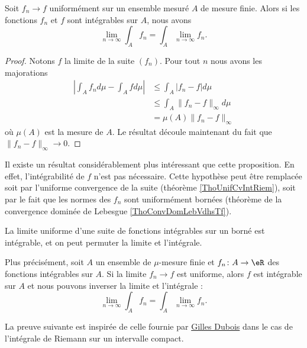 \begin{proposition}       \label{PropbhKnth}
    Soit \( f_n\to f\) uniformément sur un ensemble mesuré \( A\) de mesure finie. Alors si les fonctions \( f_n\) et \( f\) sont intégrables sur \( A\), nous avons
    \begin{equation}
        \lim_{n\to \infty} \int_A f_n=\int_A \lim_{n\to \infty} f_n.
    \end{equation}
\end{proposition}

\begin{proof}
    Notons \( f\) la limite de la suite \( (f_n)\). Pour tout \( n\) nous avons les majorations
    \begin{subequations}
        \begin{align}
            \left| \int_A f_n d\mu-\int_A fd\mu \right| &\leq \int_A| f_n-f |d\mu\\
            &\leq \int_A \| f_n-f \|_{\infty}d\mu\\
            &=\mu(A)\| f_n-f \|_{\infty}
        \end{align}
    \end{subequations}
    où \( \mu(A)\) est la mesure de \( A\). Le résultat découle maintenant du fait que \( \| f_n-f \|_{\infty}\to 0\).
\end{proof}
Il existe un résultat considérablement plus intéressant que cette proposition. En effet, l'intégrabilité de \( f\) n'est pas nécessaire. Cette hypothèse peut être remplacée soit par l'uniforme convergence de la suite (théorème \ref{ThoUnifCvIntRiem}), soit par le fait que les normes des \( f_n\) sont uniformément bornées (théorème de la convergence dominée de Lebesgue \ref{ThoConvDomLebVdhsTf}).

\begin{theorem}			\label{ThoUnifCvIntRiem}
    La limite uniforme d'une suite de fonctions intégrables sur un borné est intégrable, et on peut permuter la limite et l'intégrale. 
    
    Plus précisément, soit \( A\) un ensemble de \( \mu\)-mesure finie et \( f_n\colon A\to \eR\) des fonctions intégrables sur \( A\). Si la limite \( f_n\to f\) est uniforme, alors \( f\) est intégrable sur \( A\) et nous pouvons inverser la limite et l'intégrale :
    \begin{equation}
        \lim_{n\to \infty} \int_A f_n=\int_A\lim_{n\to \infty} f_n.
    \end{equation}
\end{theorem}
La preuve suivante est inspirée de celle fournie par \href{http://dubois.gilles.pagesperso-orange.fr/analyse_reelle/intlimites.html}{Gilles Dubois} dans le cas de l'intégrale de Riemann sur un intervalle compact.

